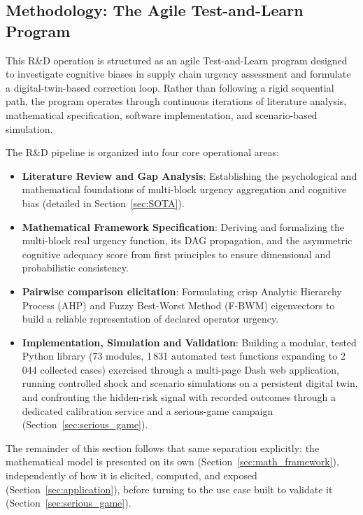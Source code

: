 \subsection{Methodology: The Agile Test-and-Learn Program}

This R\&D operation is structured as an agile Test-and-Learn program designed to investigate cognitive biases in supply chain urgency assessment and formulate a digital-twin-based correction loop. Rather than following a rigid sequential path, the program operates through continuous iterations of literature analysis, mathematical specification, software implementation, and scenario-based simulation.

The R\&D pipeline is organized into four core operational areas:
\begin{itemize}
    \item \textbf{Literature Review and Gap Analysis}: Establishing the psychological and mathematical foundations of multi-block urgency aggregation and cognitive bias (detailed in Section~\ref{sec:SOTA}).
    \item \textbf{Mathematical Framework Specification}: Deriving and formalizing the multi-block real urgency function, its DAG propagation, and the asymmetric cognitive adequacy score from first principles to ensure dimensional and probabilistic consistency.
    \item \textbf{Pairwise comparison elicitation}: Formulating crisp Analytic Hierarchy Process (AHP) and Fuzzy Best-Worst Method (F-BWM) eigenvectors to build a reliable representation of declared operator urgency.
    \item \textbf{Implementation, Simulation and Validation}: Building a modular, tested Python library (73 modules, 1\,831 automated test functions expanding to 2\,044 collected cases) exercised through a multi-page Dash web application, running controlled shock and scenario simulations on a persistent digital twin, and confronting the hidden-risk signal with recorded outcomes through a dedicated calibration service and a serious-game campaign (Section~\ref{sec:serious_game}).
\end{itemize}

The remainder of this section follows that same separation explicitly: the mathematical model is presented on its own (Section~\ref{sec:math_framework}), independently of how it is elicited, computed, and exposed (Section~\ref{sec:application}), before turning to the use case built to validate it (Section~\ref{sec:serious_game}).


